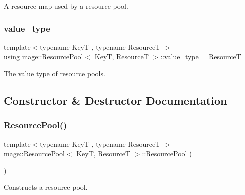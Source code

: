 A resource map used by a resource pool. \hypertarget{classmage_1_1_resource_pool_a5297ef9d8f854a606391ace5a9746a85}{}\label{classmage_1_1_resource_pool_a5297ef9d8f854a606391ace5a9746a85} 
\subsubsection{\texorpdfstring{value\+\_\+type}{value\_type}}
{\footnotesize\ttfamily template$<$typename KeyT , typename ResourceT $>$ \\
using \hyperlink{classmage_1_1_resource_pool}{mage\+::\+Resource\+Pool}$<$ KeyT, ResourceT $>$\+::\hyperlink{classmage_1_1_resource_pool_a5297ef9d8f854a606391ace5a9746a85}{value\+\_\+type} =  ResourceT}

The value type of resource pools. 

\subsection{Constructor \& Destructor Documentation}
\hypertarget{classmage_1_1_resource_pool_a94aff142869744ed48fb1b426face48b}{}\label{classmage_1_1_resource_pool_a94aff142869744ed48fb1b426face48b} 
\subsubsection{\texorpdfstring{Resource\+Pool()}{ResourcePool()}\hspace{0.1cm}{\footnotesize\ttfamily [1/3]}}
{\footnotesize\ttfamily template$<$typename KeyT , typename ResourceT $>$ \\
\hyperlink{classmage_1_1_resource_pool}{mage\+::\+Resource\+Pool}$<$ KeyT, ResourceT $>$\+::\hyperlink{classmage_1_1_resource_pool}{Resource\+Pool} (\begin{DoxyParamCaption}{ }\end{DoxyParamCaption})\hspace{0.3cm}{\ttfamily [default]}}

Constructs a resource pool. \hypertarget{classmage_1_1_resource_pool_ad1cc0cf98317e65900879b85625f10ac}{}\label{classmage_1_1_resource_pool_ad1cc0cf98317e65900879b85625f10ac} 
